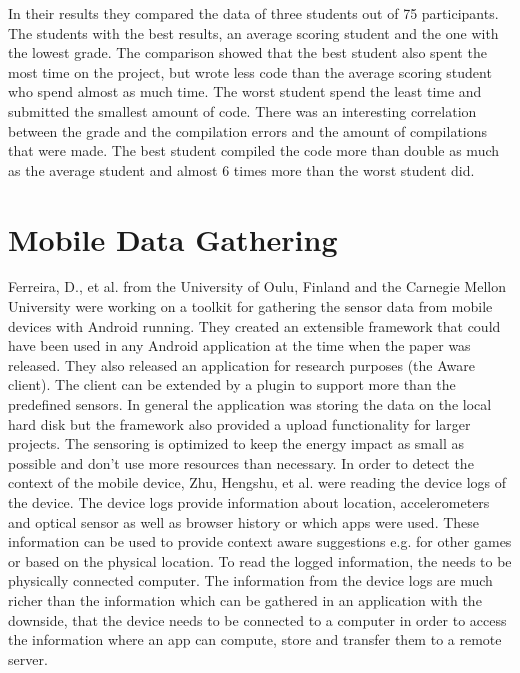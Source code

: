 In their results they compared the data of three students out of 75 participants. The students with the best results, an average scoring student and the one with the lowest grade. 
The comparison showed that the best student also spent the most time on the project, but wrote less code than the average scoring student who spend almost as much time. The worst student spend the least time and submitted the smallest amount of code. There was an interesting correlation between the grade and the compilation errors and the amount of compilations that were made. The best student compiled the code more than double as much as the average student and almost 6 times more than the worst student did. \cite{norris2008clockit}

\section{Mobile Data Gathering}
Ferreira, D., et al. \cite{ferreira2015aware} from the University of Oulu, Finland and the Carnegie Mellon University were working on a toolkit for gathering the sensor data from mobile devices with Android running. They created an extensible framework that could have been used in any Android application at the time when the paper was released. They also released an application for research purposes (the Aware client). The client can be extended by a plugin to support more than the predefined sensors. In general the application was storing the data on the local hard disk but the framework also provided a upload functionality for larger projects. 
The sensoring is optimized to keep the energy impact as small as possible and don't use more resources than necessary.
In order to detect the context of the mobile device, Zhu, Hengshu, et al. \cite{zhu2015mining} were reading the device logs of the device. The device logs provide information about location, accelerometers and optical sensor as well as browser history or which apps were used. These information can be used to provide context aware suggestions e.g. for other games or based on the physical location. To read the logged information, the needs to be physically connected computer. 
The information from the device logs are much richer than the information which can be gathered in an application with the downside, that the device needs to be connected to a computer in order to access the information where an app can compute, store and transfer them to a remote server.

